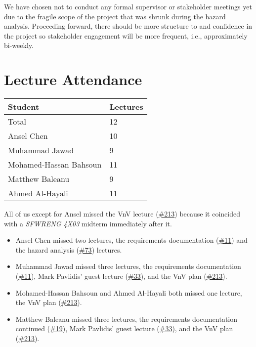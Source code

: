 \documentclass{article}
\begin{document}
We have chosen not to conduct any formal supervisor or stakeholder meetings yet due to the fragile scope of the project that was shrunk during the hazard analysis. Proceeding forward, there should be more structure to and confidence in the project so stakeholder engagement will be more frequent, i.e., approximately bi-weekly.

\section{Lecture Attendance}



\begin{table}[H]
\centering
\begin{tabular}{ll}
\toprule
\textbf{Student} & \textbf{Lectures}\\
\midrule
Total & 12\\
Ansel Chen & 10\\
Muhammad Jawad & 9\\
Mohamed-Hassan Bahsoun & 11\\
Matthew Baleanu & 9\\
Ahmed Al-Hayali & 11\\
\bottomrule
\end{tabular}
\end{table}

All of us except for Ansel missed the VnV lecture (\href{https://github.com/AhmedAl-Hayali/GenreGuru/issues/213}{\#213}) because it coincided with a \emph{SFWRENG 4X03} midterm immediately after it.
\begin{itemize}
    \item Ansel Chen missed two lectures, the requirements documentation (\href{https://github.com/AhmedAl-Hayali/GenreGuru/issues/11}{\#11}) and the hazard analysis (\href{https://github.com/AhmedAl-Hayali/GenreGuru/issues/73}{\#73}) lectures.
    \item Muhammad Jawad missed three lectures, the requirements documentation (\href{https://github.com/AhmedAl-Hayali/GenreGuru/issues/11}{\#11}), Mark Pavlidis' guest lecture (\href{https://github.com/AhmedAl-Hayali/GenreGuru/issues/33}{\#33}), and the VnV plan (\href{https://github.com/AhmedAl-Hayali/GenreGuru/issues/213}{\#213}).
    \item Mohamed-Hassan Bahsoun and Ahmed Al-Hayali both missed one lecture, the VnV plan (\href{https://github.com/AhmedAl-Hayali/GenreGuru/issues/213}{\#213}).
    \item Matthew Baleanu missed three lectures, the requirements documentation continued (\href{https://github.com/AhmedAl-Hayali/GenreGuru/issues/19}{\#19}), Mark Pavlidis' guest lecture (\href{https://github.com/AhmedAl-Hayali/GenreGuru/issues/33}{\#33}), and the VnV plan (\href{https://github.com/AhmedAl-Hayali/GenreGuru/issues/213}{\#213}).
\end{itemize}
\end{document}
